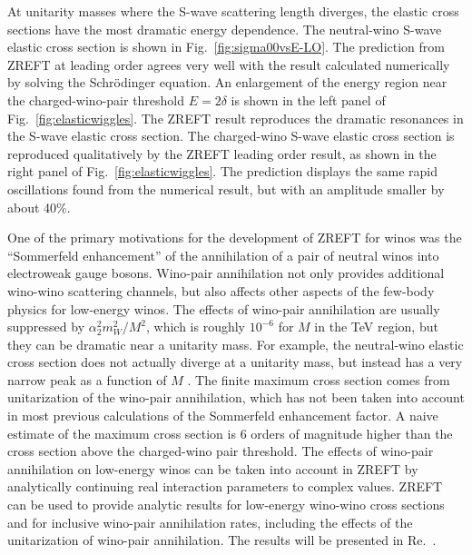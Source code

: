 \documentclass[%
 reprint,
 amsmath,amssymb,
 aps,
]{revtex4-1}
\begin{document}
At unitarity masses where the S-wave scattering length diverges, the elastic cross sections have the most dramatic energy dependence.
The neutral-wino S-wave elastic cross section is shown in Fig.~\ref{fig:sigma00vsE-LO}.
The prediction from ZREFT at leading order agrees very well with the result calculated numerically by solving the Schr\"odinger equation.
An enlargement of the energy region near the charged-wino-pair threshold $E=2\delta$ is shown in the left panel of Fig.~\ref{fig:elasticwiggles}.
The ZREFT result reproduces the dramatic resonances in the S-wave elastic cross section.
The charged-wino S-wave elastic cross section is reproduced qualitatively by the ZREFT leading order result, as shown in the right panel of Fig.~\ref{fig:elasticwiggles}.
The prediction displays the same rapid oscillations found from the numerical result, but with an amplitude smaller by about 40\%.

One of the primary motivations for the development of ZREFT for winos was the ``Sommerfeld enhancement'' of the annihilation of a pair of neutral winos into electroweak gauge bosons. 
Wino-pair annihilation not only provides additional wino-wino scattering channels, but also affects other aspects of the few-body physics for low-energy winos. 
The effects of wino-pair annihilation are usually suppressed by $\alpha_2^2 m_W^2/M^2$, which is roughly $10^{-6}$ for $M$ in the TeV region, but they can be dramatic near  a unitarity mass. 
For example, the neutral-wino elastic cross section does not actually diverge at a unitarity mass, but instead has a very narrow peak as a function of $M$ \cite{Blum:2016nrz}. 
The finite maximum cross section comes from unitarization of the wino-pair annihilation, which has not been taken into account in most previous calculations of the Sommerfeld enhancement factor. 
A naive estimate of the maximum cross section is 6 orders of magnitude higher than the cross section above the charged-wino pair threshold. 
The effects of wino-pair annihilation on low-energy winos can be taken into account in ZREFT by analytically continuing real interaction parameters to complex values. 
ZREFT can be used to provide analytic results for low-energy wino-wino cross sections and for inclusive wino-pair annihilation rates, including the effects of the unitarization of wino-pair annihilation. 
The results will be presented in Re.~\cite{BJZ-Annihilation}.





\end{document}
